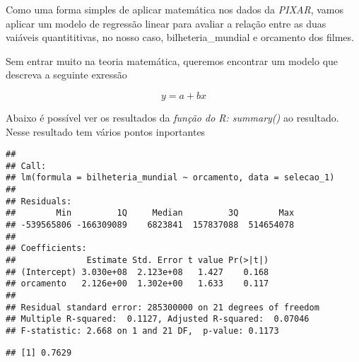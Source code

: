 \documentclass[
]{article}
\newenvironment{Shaded}{\begin{snugshade}}{\end{snugshade}}
\newcommand{\AttributeTok}[1]{\textcolor[rgb]{0.77,0.63,0.00}{#1}}
\newcommand{\DecValTok}[1]{\textcolor[rgb]{0.00,0.00,0.81}{#1}}
\newcommand{\FunctionTok}[1]{\textcolor[rgb]{0.00,0.00,0.00}{#1}}
\newcommand{\NormalTok}[1]{#1}
\newcommand{\OtherTok}[1]{\textcolor[rgb]{0.56,0.35,0.01}{#1}}
\newcommand{\SpecialCharTok}[1]{\textcolor[rgb]{0.00,0.00,0.00}{#1}}
\begin{document}
Como uma forma simples de aplicar matemática nos dados da \emph{PIXAR},
vamos aplicar um modelo de regressão linear para avaliar a relação entre
as duas vaiáveis quantititivas, no nosso caso, bilheteria\_mundial e
orcamento dos filmes.

Sem entrar muito na teoria matemática, queremos encontrar um modelo que
descreva a seguinte exressão

\[
y = a + bx
\]

Abaixo é possível ver os resultados da \emph{função do R: summary()} ao
resultado. Nesse resultado tem vários pontos inportantes

\begin{verbatim}
## 
## Call:
## lm(formula = bilheteria_mundial ~ orcamento, data = selecao_1)
## 
## Residuals:
##        Min         1Q     Median         3Q        Max 
## -539565806 -166309089    6823841  157837088  514654078 
## 
## Coefficients:
##              Estimate Std. Error t value Pr(>|t|)
## (Intercept) 3.030e+08  2.123e+08   1.427    0.168
## orcamento   2.126e+00  1.302e+00   1.633    0.117
## 
## Residual standard error: 285300000 on 21 degrees of freedom
## Multiple R-squared:  0.1127, Adjusted R-squared:  0.07046 
## F-statistic: 2.668 on 1 and 21 DF,  p-value: 0.1173
\end{verbatim}

\begin{Shaded}
\end{Shaded}

\begin{verbatim}
## [1] 0.7629
\end{verbatim}
\end{document}
